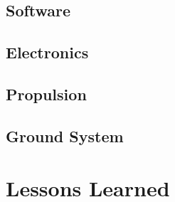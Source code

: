 \documentclass{article}
\begin{document}
\subsection{Software}

\subsection{Electronics}

\subsection{Propulsion}

\subsection{Ground System}

\section{Lessons Learned}
\end{document}
